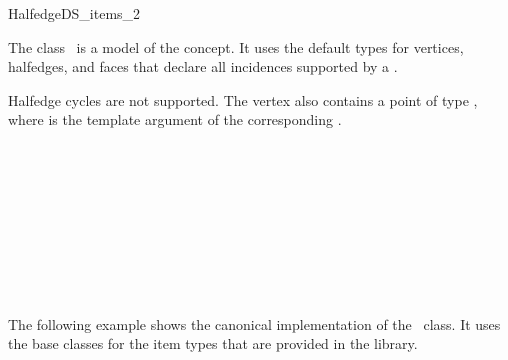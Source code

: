 
\ccRefPageBegin



\begin{ccRefClass}{HalfedgeDS_items_2}
\label{pageHalfedgeDSitemsRef}

\ccDefinition
  
The class \ccRefName\ is a model of the  concept.
It uses the default types for vertices, halfedges, and faces that
declare all incidences supported by a .
{\XHDS Halfedge cycles are not supported. 
The vertex also contains a point of type , 
where  is the template argument of the corresponding .


\ccIsModel


\ccSeeAlso

\\
\\
\\
\\
\\
\\
\\
\\

\ccExample

The following example shows the canonical implementation of the
\ccRefName\ class. It uses the base classes for the item types that
are provided in the library.

}
\end{ccRefClass}
